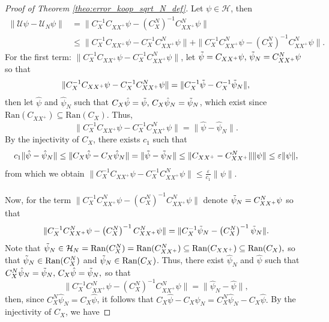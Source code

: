 \documentclass{article}
\renewcommand{\H}{\mathcal{H}}
\newcommand{\U}{\mathcal{U}}
\begin{document}
\begin{proof}[Proof of Theorem \ref{theo:error_koop_sqrt_N_def}]
    Let $\psi \in \H$, then
\[
\begin{aligned}
    \| \U \psi - \U_N \psi \| &= \| C_X^{-1} C_{XX^+} \psi - \left (C_X^N \right )^{-1} C_{XX^+}^N \psi \| \\
    & \leq \| C_X^{-1} C_{XX^+} \psi - C_X^{-1} C_{XX^+}^N \psi \| + \| C_X^{-1} C_{XX^+}^N \psi - \left (C_X^N \right )^{-1} C_{XX^+}^N \psi \|.
\end{aligned}
\]
For the first term: \(\| C_X^{-1} C_{XX^+} \psi - C_X^{-1} C_{XX^+}^N \psi \|\),
let \(\Tilde{\psi} = C_{XX^+} \psi, \,  \Tilde{\psi}_N = C_{XX^+}^N \psi\) so that
\[
\| C_X^{-1} C_{XX^+} \psi - C_X^{-1} C_{XX^+}^N \psi \| = \| C_X^{-1} \Tilde{\psi} - C_X^{-1} \Tilde{\psi}_N \|,
\]
then let $\hat{\psi}$ and $\hat{\psi}_N$ such that \(C_X \hat{\psi} = \Tilde{\psi}, \, C_X \hat{\psi}_N = \Tilde{\psi}_N\), 
which exist since $\text{Ran}(C_{XX^+}) \subseteq \text{Ran}(C_X)$. Thus,
\[
\| C_X^{-1} C_{XX^+} \psi - C_X^{-1} C_{XX^+}^N \psi \| = \|\hat{\psi} - \hat{\psi}_N \|.
\]
By the injectivity of $C_X$, there exists $c_1$ such that
\[
c_1 \| \hat{\psi} - \hat{\psi}_N  \| \leq \| C_X \hat{\psi} - C_X \hat{\psi}_N \| = \| \Tilde{\psi} - \Tilde{\psi}_N \| \leq \| C_{XX^+} - C_{XX^+}^N \| \| \psi \| \leq \varepsilon \| \psi \|,
\]
from which we obtain \( \displaystyle\| C_X^{-1} C_{XX^+} \psi - C_X^{-1} C_{XX^+}^N \psi \| \leq \frac{\varepsilon}{c_1} \| \psi \|\).
\\
\\
Now, for the term  \(\| C_X^{-1} C_{XX^+}^N \psi - \left (C_X^N \right )^{-1} C_{XX^+}^N \psi \|\) denote \(\Tilde{\psi}_N = C_{XX^+}^N \psi\) so that  
\[
\| C_X^{-1} C_{XX^+}^N \psi - \left (C_X^N \right )^{-1} C_{XX^+}^N \psi \| = \| C_X^{-1} \Tilde{\psi}_N - \left (C_X^N \right )^{-1} \Tilde{\psi}_N \|.
\]
Note that  \(
\Tilde{\psi}_N \in 
\H_N = \text{Ran}(C_{X}^N) = \text{Ran}(C_{XX^+}^N) \subseteq \text{Ran}(C_{XX^+}) \subseteq \text{Ran}(C_X),
\) so that $\Tilde{\psi}_N \in \text{Ran}(C_{X}^N)$ and $\Tilde{\psi}_N \in \text{Ran}(C_{X})$. Thus, there exist $\hat{\psi}_N$ and $\hat{\psi}$ such that \(C_X^N \hat{\psi}_N = \Tilde{\psi}_N, \, C_X \hat{\psi} = \Tilde{\psi}_N,\)
so that  
\[
\| C_X^{-1} C_{XX^+}^N \psi - \left (C_X^N \right )^{-1} C_{XX^+}^N \psi \| = \| \hat{\psi}_N - \hat{\psi}\|,
\]
then, since $C_X^N \hat{\psi}_N = C_X \hat{\psi}$, it follows that  \(C_X \hat{\psi} - C_X \hat{\psi}_N = C_X^N \hat{\psi}_N - C_X \hat{\psi}.\) By the injectivity of \( C_X \), we have  

\end{proof}
\end{document}
